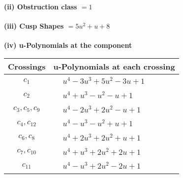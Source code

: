\documentclass[1p]{elsarticle_modified}
\theoremstyle{definition}
\begin{document}
\flushleft \textbf{(ii) Obstruction class $= 1$}\\~\\
\flushleft \textbf{(iii) Cusp Shapes $= 5 u^2+u+8$}\\~\\
\newpage\renewcommand{\arraystretch}{1}
\flushleft \textbf{(iv) u-Polynomials at the component}\newline \\
\begin{tabular}{m{50pt}|m{274pt}}
Crossings & \hspace{64pt}u-Polynomials at each crossing \\
\hline $$\begin{aligned}c_{1}\end{aligned}$$&$\begin{aligned}
&u^4-3 u^3+5 u^2-3 u+1
\end{aligned}$\\
\hline $$\begin{aligned}c_{2}\end{aligned}$$&$\begin{aligned}
&u^4+u^3- u^2- u+1
\end{aligned}$\\
\hline $$\begin{aligned}c_{3},c_{5},c_{9}\end{aligned}$$&$\begin{aligned}
&u^4-2 u^3+2 u^2- u+1
\end{aligned}$\\
\hline $$\begin{aligned}c_{4},c_{12}\end{aligned}$$&$\begin{aligned}
&u^4- u^3- u^2+u+1
\end{aligned}$\\
\hline $$\begin{aligned}c_{6},c_{8}\end{aligned}$$&$\begin{aligned}
&u^4+2 u^3+2 u^2+u+1
\end{aligned}$\\
\hline $$\begin{aligned}c_{7},c_{10}\end{aligned}$$&$\begin{aligned}
&u^4+u^3+2 u^2+2 u+1
\end{aligned}$\\
\hline $$\begin{aligned}c_{11}\end{aligned}$$&$\begin{aligned}
&u^4- u^3+2 u^2-2 u+1
\end{aligned}$\\
\hline
\end{tabular}\\~\\
\end{document}
